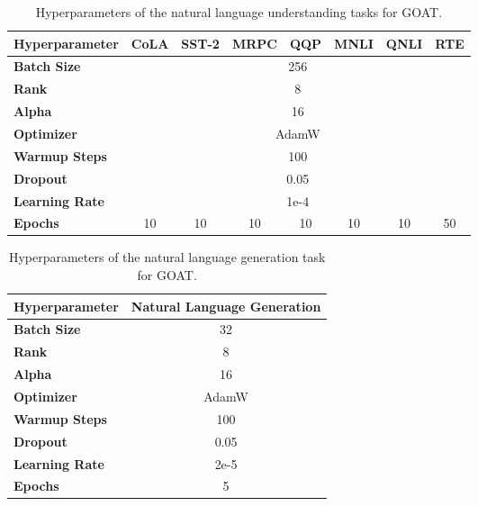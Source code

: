 \begin{table}[ht]
\centering
\small
\caption{Hyperparameters of the natural language understanding tasks for GOAT.}
\begin{tabular}{l|ccccccc}
\toprule
\textbf{Hyperparameter}                     & \textbf{CoLA} & \textbf{SST-2} & \textbf{MRPC} & \textbf{QQP}  & \textbf{MNLI} & \textbf{QNLI} & \textbf{RTE}  \\ \midrule
\textbf{Batch Size}                         & \multicolumn{7}{c}{256} \\
\textbf{Rank}                               & \multicolumn{7}{c}{8}   \\
\textbf{Alpha}                              & \multicolumn{7}{c}{16}  \\
\textbf{Optimizer}                          & \multicolumn{7}{c}{AdamW} \\
\textbf{Warmup Steps}                       & \multicolumn{7}{c}{100} \\
\textbf{Dropout}                            & \multicolumn{7}{c}{0.05} \\
\textbf{Learning Rate}                      & \multicolumn{7}{c}{1e-4} \\
\textbf{Epochs}                             & 10   & 10    & 10    & 10   & 10    & 10    & 50   \\ \bottomrule
\end{tabular}
\label{tab:nlu_hyper}
\end{table}

\begin{table}[ht]
\centering
\small
\caption{Hyperparameters of the natural language generation task for GOAT.}
\begin{tabular}{l|c}
\toprule
\textbf{Hyperparameter}                     & \textbf{Natural Language Generation} \\ \midrule
\textbf{Batch Size}                         & 32                          \\
\textbf{Rank}                               & 8                           \\
\textbf{Alpha}                              & 16                          \\
\textbf{Optimizer}                          & AdamW                       \\
\textbf{Warmup Steps}                       & 100                         \\
\textbf{Dropout}                            & 0.05                        \\
\textbf{Learning Rate}                      & 2e-5                        \\ 
\textbf{Epochs}                             & 5                           \\ \bottomrule
\end{tabular}
\label{tab:nlg_hyper}
\end{table}
